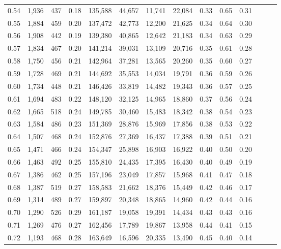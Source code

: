 \begin{tabular}{rrrrrrrrrrrrrr}
0.54 &  1,936 &  437 &  0.18 &  135,588 &   44,657 &  11,741 &  22,084 &  0.33 &  0.65 &      0.31 \\
0.55 &  1,884 &  459 &  0.20 &  137,472 &   42,773 &  12,200 &  21,625 &  0.34 &  0.64 &      0.30 \\
0.56 &  1,908 &  442 &  0.19 &  139,380 &   40,865 &  12,642 &  21,183 &  0.34 &  0.63 &      0.29 \\
0.57 &  1,834 &  467 &  0.20 &  141,214 &   39,031 &  13,109 &  20,716 &  0.35 &  0.61 &      0.28 \\
0.58 &  1,750 &  456 &  0.21 &  142,964 &   37,281 &  13,565 &  20,260 &  0.35 &  0.60 &      0.27 \\
0.59 &  1,728 &  469 &  0.21 &  144,692 &   35,553 &  14,034 &  19,791 &  0.36 &  0.59 &      0.26 \\
0.60 &  1,734 &  448 &  0.21 &  146,426 &   33,819 &  14,482 &  19,343 &  0.36 &  0.57 &      0.25 \\
0.61 &  1,694 &  483 &  0.22 &  148,120 &   32,125 &  14,965 &  18,860 &  0.37 &  0.56 &      0.24 \\
0.62 &  1,665 &  518 &  0.24 &  149,785 &   30,460 &  15,483 &  18,342 &  0.38 &  0.54 &      0.23 \\
0.63 &  1,584 &  486 &  0.23 &  151,369 &   28,876 &  15,969 &  17,856 &  0.38 &  0.53 &      0.22 \\
0.64 &  1,507 &  468 &  0.24 &  152,876 &   27,369 &  16,437 &  17,388 &  0.39 &  0.51 &      0.21 \\
0.65 &  1,471 &  466 &  0.24 &  154,347 &   25,898 &  16,903 &  16,922 &  0.40 &  0.50 &      0.20 \\
0.66 &  1,463 &  492 &  0.25 &  155,810 &   24,435 &  17,395 &  16,430 &  0.40 &  0.49 &      0.19 \\
0.67 &  1,386 &  462 &  0.25 &  157,196 &   23,049 &  17,857 &  15,968 &  0.41 &  0.47 &      0.18 \\
0.68 &  1,387 &  519 &  0.27 &  158,583 &   21,662 &  18,376 &  15,449 &  0.42 &  0.46 &      0.17 \\
0.69 &  1,314 &  489 &  0.27 &  159,897 &   20,348 &  18,865 &  14,960 &  0.42 &  0.44 &      0.16 \\
0.70 &  1,290 &  526 &  0.29 &  161,187 &   19,058 &  19,391 &  14,434 &  0.43 &  0.43 &      0.16 \\
0.71 &  1,269 &  476 &  0.27 &  162,456 &   17,789 &  19,867 &  13,958 &  0.44 &  0.41 &      0.15 \\
0.72 &  1,193 &  468 &  0.28 &  163,649 &   16,596 &  20,335 &  13,490 &  0.45 &  0.40 &      0.14 \\

\end{tabular}
